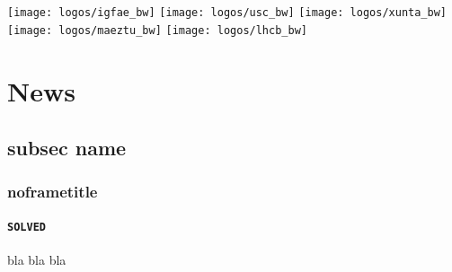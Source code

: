 \documentclass[aspectratio=43]{beamer}
\begin{document}




\begin{frame}[plain,overlaytitlepage=0.9]
  \begin{minipage}[b][\textheight][b]{5cm}
    \texttt{[image: logos/igfae\_bw]}\hspace{1mm}
    \texttt{[image: logos/usc\_bw]}\hspace{1mm}
    \texttt{[image: logos/xunta\_bw]}\hspace{1mm}\\[2mm]
    \texttt{[image: logos/maeztu\_bw]}\hspace{1mm}
    \texttt{[image: logos/lhcb\_bw]}\\[-1mm]
  \end{minipage}
\end{frame}

\begin{frame}[plain,overlaytoc=0.9]
  \addtocounter{framenumber}{-1}
  \hspace*{5.3cm}\begin{minipage}{8cm}
    \tableofcontents
  \end{minipage}
\end{frame}





\section{News}

\subsection{subsec name}
\begin{frame}[default]
\frametitle{noframetitle}
\framesubtitle{ \texttt{\color{scqgreen}SOLVED} }

bla bla bla

\end{frame}




%

%
\end{document}
